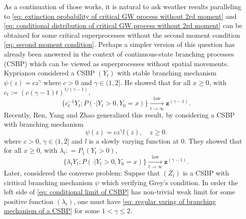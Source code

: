 \documentclass[12pt, a4paper]{amsart}
\theoremstyle{definition}
\numberwithin{equation}{section}
\begin{document}
	As a continuation of those works, it is natural to ask weather results paralleling to \eqref{eq: extinction probability of critical GW process without 2rd moment} and \eqref{eq: conditional distribution of critical GW process without 2rd moment} can be obtained for some critical superprocesses without the second moment condition \eqref{eq: second moment condition}.
	Perhaps a simpler version of this question has already been answered in the context of continuous-state branching processes (CSBP) which can be viewed as superprocesses without spatial movements. 
	Kyprianou \cite{Kyprianou2008Continuous} considered a CSBP $(Y_t)$ with stable branching mechanism $\psi(z) =c z^\gamma$ where $c > 0$ and $\gamma \in (1,2]$. He showed that for all $x\geq 0$, with $c_t := (c(\gamma - 1)t)^{1/(\gamma - 1)}$, 
\[ \label{eq: conditional limit of CSBP with stable branching}
	\{c_t^{-1}Y_t; P( \cdot |Y_t > 0,Y_0 = x)\} 
	\xrightarrow[t\to \infty]{\operatorname{law}} \mathbf z^{(\gamma - 1)}.
\]
	Recently, Ren, Yang and Zhao \cite{RenYangZhao2014Conditional} generalized this result, by considering a CSBP with branching mechanism 
\[\label{eq: regular varing of branching mechanism of a CSBP}
	\psi(z) 
	= c z^\gamma l(z), 
	\quad z\geq 0.
\] 
	where $c > 0$, $\gamma \in (1,2]$ and $l$ is a slowly varying function at $0$. 
	They showed that for all $x\geq 0$, with $\lambda_t: = P_1(Y_t > 0)$,
\[\label{eq: conditional limit of CSBP}
	\{ \lambda_t Y_t ; P(\cdot | Y_t > 0, Y_0 = x)\}
	\xrightarrow[t\to \infty]{\operatorname{law}} \mathbf z^{(\gamma - 1)}.
\]
	Later, \cite{IyerLegerPego2015Limit} considered the converse problem: Suppse that $(Z_t)$ is a CSBP with ciritical branching mechanism $\psi$ which verifying Grey's condition. 
	In order the left side of  \eqref{eq: conditional limit of CSBP} has non-trivial weak limit for some positive function $(\lambda_t)$, one must have \eqref{eq: regular varing of branching mechanism of a CSBP} for some $1< \gamma \leq 2$.
	
\end{document}
